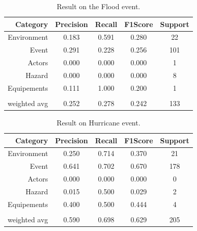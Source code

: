 \begin{table}[htbp]
    \centering
    \caption{Result on the Flood event.}
    \begin{tabular}{rcccc}
        Category     & Precision & \textbf{Recall} & F1\-Score & Support \\
        \toprule
        Environment  & 0.183     & 0.591           & 0.280     & 22      \\
        Event        & 0.291     & 0.228           & 0.256     & 101     \\
        Actors       & 0.000     & 0.000           & 0.000     & 1       \\
        Hazard       & 0.000     & 0.000           & 0.000     & 8       \\
        Equipements  & 0.111     & 1.000           & 0.200     & 1       \\
                     &           &                 &           &         \\
        weighted avg & 0.252     & 0.278           & 0.242     & 133     \\
        \bottomrule
    \end{tabular}
    \label{table:flood-results}
\end{table}

\begin{table}[htbp]
    \centering
    \caption{Result on Hurricane event.}
    \begin{tabular}{rcccc}
        Category     & Precision & \textbf{Recall} & F1\-Score & Support \\
        \toprule
        Environment  & 0.250     & 0.714           & 0.370     & 21      \\
        Event        & 0.641     & 0.702           & 0.670     & 178     \\
        Actors       & 0.000     & 0.000           & 0.000     & 0       \\
        Hazard       & 0.015     & 0.500           & 0.029     & 2       \\
        Equipements  & 0.400     & 0.500           & 0.444     & 4       \\
                     &           &                 &           &         \\
        weighted avg & 0.590     & 0.698           & 0.629     & 205     \\
        \bottomrule
    \end{tabular}
    \label{table:hurricane-results}
\end{table}

